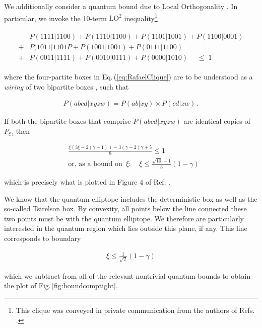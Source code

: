 \documentclass[
  12pt          %
  ,letterpaper  %
  ,center       %
  ,noupper      %
  ,english,fleqn]{uconnthesis}
\newcommand{\LeftEqns}[1]{\begin{fleqn}[\leftmargini minus \leftmargini]\begin{align}#1\end{align}\end{fleqn}}
\newcommand{\LeftEqn}[1]{\LeftEqns{\begin{split}#1\end{split}}}
\newcommand{\ceq}[1]{Eq.\,(\ref{#1})}
\newcommand{\fig}[1]{Fig.\,\ref{#1}}
\begin{document}
We additionally consider a quantum bound due to Local Orthogonality \cite{LONatureComm,FritzCombinatorialLong,LONewShort,LOHardy,LOExploring}. In particular, we invoke the 10-term $\mbox{LO}^2$ inequality\footnote{This \gls{clique} was conveyed in private communication from the authors of Refs. \cite{LONatureComm}.}
\LeftEqn{\label{eq:RafaelClique}
&P(1111|1100)+P(1110|1100)+P(1101|1001)+P(1100|0001)
\\+&P(1011|1101P+P(1001|1001)+P(0111|1100)
\\+&P(0011|1111)+P(0010|0111)+P(0000|1010)\;\quad\leq\; 1
}
where the four-partite boxes in \ceq{eq:RafaelClique} are to be understood as a \emph{wiring} of two bipartite boxes \cite{LOExploring}, such that 
\LeftEqns{
P(abcd|xyzw)=P(ab|xy)\times P(cd|zw)\,.
}
If both the bipartite boxes that comprise $P(abcd|xyzw)$ are identical copies of $P_{\xi\gamma}$ then 
\LeftEqns{
&\frac{\xi  \left(3 \xi -2 \left(\gamma -1\right)\right)-3 \left(\gamma -2\right) \gamma +5}{8}\leq 1 \\
&\text{or, as a bound on }\,\xi:\quad \xi \leq \frac{\sqrt{10}-1}{3}\left(1-\gamma\right)
}
which is precisely what is plotted in Figure 4 of Ref. \cite{LONatureComm}. 


We know that the quantum \gls{elliptope} includes the deterministic box as well as the so-called Tsirelson box. By convexity, all points below the line connected these two points must be with the quantum elliptope. We therefore are particularly interested in the quantum region which lies outside this plane, if any. This line corresponds to boundary
\LeftEqns{
\xi \leq \frac{1}{\sqrt{2}}\left(1-\gamma\right)
}
which we subtract from all of the relevant nontrivial quantum bounds to obtain the plot of \fig{fig:boundcomptight}.
\end{document}

